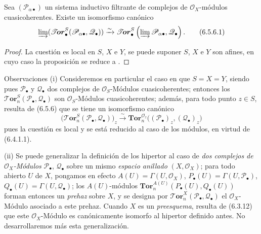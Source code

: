 \begin{proposition}[6.5.6]
\label{III.6.5.6}
Sea $(\mathscr P_{\alpha\bullet})$ un sistema inductivo filtrante de
complejos de $\mathscr O_X$-módulos cuasicoherentes. Existe un
isomorfismo canónico
\[
  \varinjlim
  (\boldsymbol{\mathscr{T}\!or}_\bullet^S
  (\mathscr P_{\alpha\bullet},\mathscr Q_\bullet))
  \xrightarrow{\sim}
  \boldsymbol{\mathscr{T}\!or}_\bullet^S
  \left(\varinjlim\mathscr P_{\alpha\bullet},\mathscr Q_\bullet\right).
  \tag{6.5.6.1}\label{III.6.5.6.1.fr}
\]
\end{proposition}

\begin{proof}
La cuestión es local en $S$, $X$ e $Y$, se puede suponer $S$, $X$ e $Y$ son afines, en cuyo caso la proposición
se reduce a .
\end{proof}

\begin{namedtheorem}[6.5.7]{Observaciones}
\textnormal{(i)} Consideremos en particular el caso en que $S=X=Y$,
siendo pues $\mathscr P_\bullet$ y $\mathscr Q_\bullet$ dos complejos de
$\mathscr O_S$-Módulos cuasicoherentes; entonces los
$\boldsymbol{\mathscr{T}\!or}_n^S(\mathscr P_\bullet,\mathscr Q_\bullet)$ son
$\mathscr O_S$-Módulos cuasicoherentes; además, para todo punto $z\in S$,
resulta de (6.5.6) que se tiene un isomorfismo canónico
\[
  \bigl(\boldsymbol{\mathscr{T}\!or}_n^S
    (\mathscr P_\bullet,\mathscr Q_\bullet)\bigr)_z
  \xrightarrow{\sim}
  \mathbf{Tor}_n^{\mathscr O_z}
  \bigl((\mathscr P_\bullet)_z,(\mathscr Q_\bullet)_z\bigr)
  \tag{6.5.7.1}\label{III.6.5.7.1.fr}
\]
pues la cuestión es local y se está reducido al caso de los módulos, en virtud de
(6.4.1.1).

\textnormal{(ii)} Se puede generalizar la definición de los hipertor al caso de
\emph{dos complejos de $\mathscr O_X$-Módulos} $\mathscr P_\bullet$,
$\mathscr Q_\bullet$ sobre un mismo \emph{espacio anillado} $(X,\mathscr O_X)$; para todo
abierto $U$ de $X$, pongamos en efecto
$A(U)=\Gamma(U,\mathscr O_X)$,
$P_\bullet(U)=\Gamma(U,\mathscr P_\bullet)$,
$Q_\bullet(U)=\Gamma(U,\mathscr Q_\bullet)$; los $A(U)$-módulos
$\mathbf{Tor}_n^{A(U)}(P_\bullet(U),Q_\bullet(U))$
forman entonces un \emph{prehaz} sobre $X$, y se designa por
$\boldsymbol{\mathscr{T}\!or}_n^X(\mathscr P_\bullet,\mathscr Q_\bullet)$ el
$\mathscr O_X$-Módulo asociado a este prehaz. Cuando $X$ es un \emph{preesquema},
resulta de (6.3.12) que este $\mathscr O_X$-Módulo es canónicamente isomorfo
al hipertor definido antes. No desarrollaremos más esta
generalización.
\end{namedtheorem}

